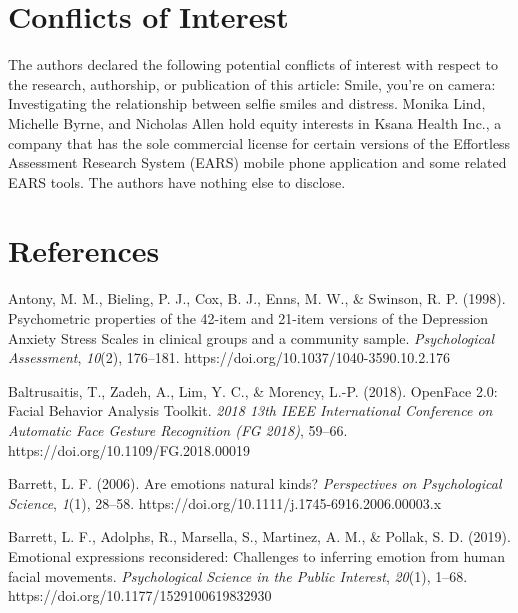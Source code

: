 \documentclass[authordate, empirical]{jote-new-article}
\begin{document}
\section{Conflicts of Interest}







The authors declared the following potential conflicts of interest with respect to the research, authorship, or publication of this article: Smile, you're on camera: Investigating the relationship between selfie smiles and distress. Monika Lind, Michelle Byrne, and Nicholas Allen hold equity interests in Ksana Health Inc., a company that has the sole commercial license for certain versions of the Effortless Assessment Research System (EARS) mobile phone application and some related EARS tools. The authors have nothing else to disclose.







\section{References}



\hspace*{\parindent}Antony, M. M., Bieling, P. J., Cox, B. J., Enns, M. W., \& Swinson, R. P. (1998). Psychometric properties of the 42-item and 21-item versions of the Depression Anxiety Stress Scales in clinical groups and a community sample. \emph{Psychological Assessment}, \emph{10}(2), 176--181. https://doi.org/10.1037/1040-3590.10.2.176



Baltrusaitis, T., Zadeh, A., Lim, Y. C., \& Morency, L.-P. (2018). OpenFace 2.0: Facial Behavior Analysis Toolkit. \emph{2018 13th IEEE International Conference on Automatic Face Gesture Recognition (FG 2018)}, 59--66. https://doi.org/10.1109/FG.2018.00019



Barrett, L. F. (2006). Are emotions natural kinds? \emph{Perspectives on Psychological Science}, \emph{1}(1), 28--58. https://doi.org/10.1111/j.1745-6916.2006.00003.x



Barrett, L. F., Adolphs, R., Marsella, S., Martinez, A. M., \& Pollak, S. D. (2019). Emotional expressions reconsidered: Challenges to inferring emotion from human facial movements. \emph{Psychological Science in the Public Interest}, \emph{20}(1), 1--68. https://doi.org/10.1177/1529100619832930
\end{document}

